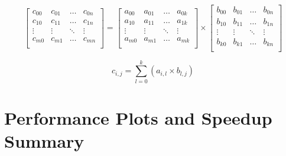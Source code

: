 \[
\begin{bmatrix}
    c_{00}  & c_{01}    & \dots     & c_{0n}\\
    c_{10}  & c_{11}    & \dots     & c_{1n}\\
    \vdots  & \vdots    & \ddots    & \vdots\\
    c_{m0}  & c_{m1}    & \dots     & c_{mn}\\
\end{bmatrix}
= 
\begin{bmatrix}
    a_{00}  & a_{01}    & \dots     & a_{0k}\\
    a_{10}  & a_{11}    & \dots     & a_{1k}\\
    \vdots  & \vdots    & \ddots    & \vdots\\
    a_{m0}  & a_{m1}    & \dots     & a_{mk}\\
\end{bmatrix}
\times
\begin{bmatrix}
    b_{00}  & b_{01}    & \dots     & b_{0n}\\
    b_{10}  & b_{11}    & \dots     & b_{1n}\\
    \vdots  & \vdots    & \ddots    & \vdots\\
    b_{k0}  & b_{k1}    & \dots     & b_{kn}\\
\end{bmatrix}
\]

\vspace*{0.5cm}

\begin{equation}
    c_{i,j} = \sum_{l=0}^k (a_{i,l} \times b_{l,j})
\end{equation}

\clearpage

\section{Performance Plots and Speedup Summary}

